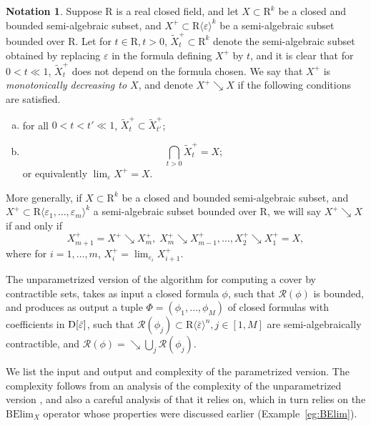\documentclass{amsart}[10pts]
\theoremstyle{definition}
\newtheorem{notation}{Notation}[section]
\theoremstyle{remark}
\theoremstyle{observation}
\numberwithin{equation}{section}
\newcommand {\R} {\mathrm{R}}
\newcommand {\D}     {\mbox{\rm D}}
\newcommand {\RR} {{\mathcal R}}
\newcommand {\la}   {{\langle}}
\newcommand {\ra}   {{\rangle}}
\newcommand {\eps} {{\varepsilon}}
\newcommand{\BElim}{\mathrm{BElim}}
\begin{document}
\begin{notation}
\label{not:monotone}
Suppose $\R$ is a real closed field,
and let $X \subset \R^k$ be a closed and bounded  semi-algebraic subset, and $X^+ \subset \R\la\eps\ra^k$
be a semi-algebraic subset bounded over $\R$. 
Let for $t \in \R, t >0$, $\widetilde{X}^+_{t} \subset \R^k$ denote the semi-algebraic
subset obtained by replacing $\eps$ in the formula defining $X^+$ by $t$, and it is
clear that  for $0 < t \ll 1$, $\widetilde{X}^+_t$ does not depend on the formula chosen. We say that $X^+$ is \emph{monotonically decreasing to $X$}, and denote $X^+ \searrow X$ if the following conditions are satisfied.
\begin{enumerate}[(a)]
\item
for all $0 < t < t'  \ll 1$,  $\widetilde{X}^+_{t} \subset  \widetilde{X}^+_{t'}$;
\item
\[
\bigcap_{t > 0} \widetilde{X}^+_{t} = X;
\]
or equivalently $\lim_\eps X^+ =  X$.
\end{enumerate}
More generally,
if $X \subset \R^k$ be a closed and bounded  semi-algebraic subset, and $X^+ \subset \R\la\eps_1,\ldots,\eps_m\ra^k$
a semi-algebraic subset bounded over $\R$,
we will say $X^+ \searrow X$ if and only if 
\[
X^+_{m+1} = X^+ \searrow X^+_m,  \;X^+_m \searrow X^+_{m-1}, \ldots, X^+_{2} \searrow X^+_1 = X,
\]
where for $i=1,\ldots, m$, $X^+_i = \lim_{\eps_i} X^+_{i+1}$. 
\end{notation}

The unparametrized version of the algorithm for computing a cover by contractible sets, takes as input a closed formula $\phi$, such that $\RR(\phi)$ is bounded, and
produces as output a tuple $\Phi = (\phi_1,\ldots,\phi_M)$ of closed formulas with coefficients in $\D[\bar\eps]$, such that
$\RR(\phi_j) \subset \R\la\bar\eps\ra^n, j \in [1,M]$ are semi-algebraically
contractible, and $\RR(\phi) = \searrow \bigcup_j \RR(\phi_j)$.

\medskip
We list the input and output and complexity of the parametrized version.
The complexity 
follows from an analysis of the complexity of the unparametrized version \cite[Algorithm 16.14]{BPRbook2}, and also a careful
analysis of \cite[Algorithm 16.5 (Parametrized bounded connecting)]{BPRbook2} that it  relies on, which in turn relies on the 
$\BElim_X$ operator whose properties were discussed earlier (Example~\ref{eg:BElim}). 
\end{document}
